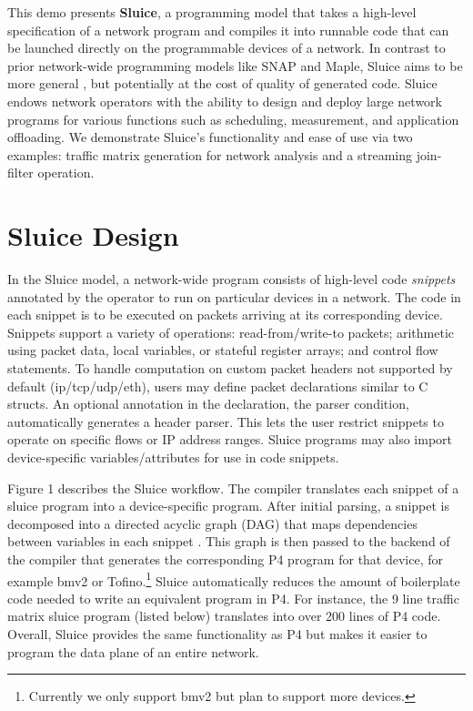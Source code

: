 This demo presents \textbf{Sluice}, a programming model that takes a high-level
specification of a network program and compiles it into runnable code that can
be launched directly on the programmable devices of a network. In contrast to
prior network-wide programming models like SNAP and Maple, Sluice aims to be
more general , but potentially at the cost of quality of generated code.
Sluice endows network operators with the ability to design and deploy large
network programs for various functions such as scheduling, measurement, and
application offloading.  We demonstrate Sluice's functionality and ease of use
via two examples: traffic matrix generation for network analysis and a
streaming join-filter operation.

\section{Sluice Design}
In the Sluice model, a network-wide program consists of high-level code
\textit{snippets} annotated by the operator to run on particular devices in a
network. The code in each snippet is to be executed on packets arriving at its
corresponding device. Snippets support a variety of operations:
read-from/write-to packets; arithmetic using packet data, local variables, or
stateful register arrays; and control flow statements. To handle computation on
custom packet headers not supported by default (ip/tcp/udp/eth), users may
define packet declarations similar to C structs. An optional annotation in the
declaration, the parser condition, automatically generates a header parser.
This lets the user restrict snippets to operate on specific flows or IP address
ranges. Sluice programs may also import device-specific variables/attributes
for use in code snippets.

Figure 1 describes the Sluice workflow. The compiler translates each snippet of
a sluice program into a device-specific program. After initial parsing, a
snippet is decomposed into a directed acyclic graph (DAG) that maps
dependencies between variables in each snippet . This
graph is then passed to the backend of the compiler that generates the
corresponding P4 program for that device, for example bmv2 or
Tofino.\footnote{Currently we only support bmv2 but plan to support more
devices.} Sluice automatically reduces the amount of boilerplate code needed to
write an equivalent program in P4. For instance, the 9 line traffic matrix
sluice program (listed below) translates into over 200 lines of P4 code.
Overall, Sluice provides the same functionality as P4 but makes it easier to
program the data plane of an entire network. 


